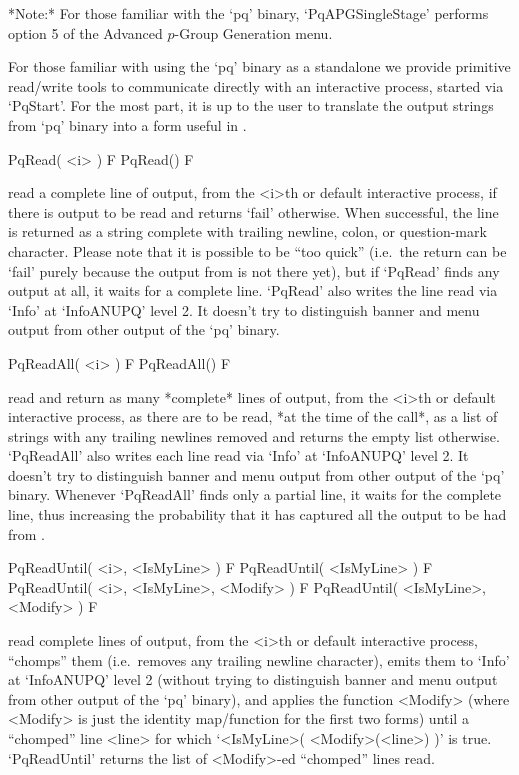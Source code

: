 *Note:*
For those familiar with  the  `pq'  binary,  `PqAPGSingleStage'  performs
option 5 of the Advanced $p$-Group Generation menu.


For those familiar with using the `pq' binary as a standalone we  provide
primitive read/write tools to communicate directly  with  an  interactive
{\ANUPQ} process, started via `PqStart'. For the most part, it is  up  to
the user to translate the output strings from `pq'  binary  into  a  form
useful in {\GAP}.

\>PqRead( <i> ) F
\>PqRead() F

read a complete line of  {\ANUPQ}  output,  from  the  <i>th  or  default
interactive {\ANUPQ} process, if there is output to be read  and  returns
`fail' otherwise. When successful, the  line  is  returned  as  a  string
complete with trailing newline, colon, or question-mark character. Please
note that it is possible to be ``too  quick''  (i.e.~the  return  can  be
`fail' purely because the output from {\ANUPQ} is not there yet), but  if
`PqRead' finds any output at all, it waits for a complete line.  `PqRead'
also writes the line read via `Info' at `InfoANUPQ' level 2.  It  doesn't
try to distinguish banner and menu output from other output of  the  `pq'
binary.

\>PqReadAll( <i> ) F
\>PqReadAll() F

read and return as many *complete* lines of  {\ANUPQ}  output,  from  the
<i>th or default interactive {\ANUPQ} process, as there are to  be  read,
*at the time of the call*,  as  a  list  of  strings  with  any  trailing
newlines removed and returns the empty list otherwise.  `PqReadAll'  also
writes each line read via `Info' at `InfoANUPQ' level 2. It  doesn't  try
to distinguish banner and menu output  from  other  output  of  the  `pq'
binary. Whenever `PqReadAll' finds only a partial line, it waits for  the
complete line, thus increasing the probability that it has  captured  all
the output to be had from {\ANUPQ}.

\>PqReadUntil( <i>, <IsMyLine> ) F
\>PqReadUntil( <IsMyLine> ) F
\>PqReadUntil( <i>, <IsMyLine>, <Modify> ) F
\>PqReadUntil( <IsMyLine>, <Modify> ) F

read complete lines  of  {\ANUPQ}  output,  from  the  <i>th  or  default
interactive {\ANUPQ} process, ``chomps'' them (i.e.~removes any  trailing
newline character), emits them to `Info' at `InfoANUPQ' level 2  (without
trying to distinguish banner and menu output from  other  output  of  the
`pq' binary), and applies the function <Modify> (where <Modify>  is  just
the identity map/function for the first two forms)  until  a  ``chomped''
line  <line>  for  which  `<IsMyLine>(  <Modify>(<line>)  )'   is   true.
`PqReadUntil' returns the list of <Modify>-ed ``chomped'' lines read.

